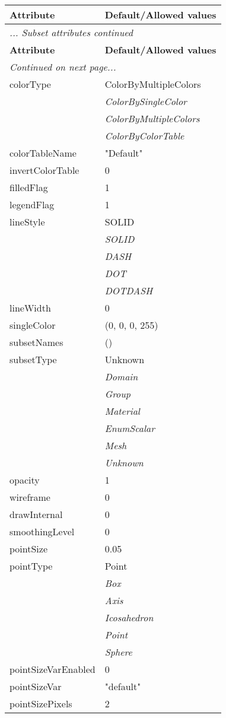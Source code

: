 \documentclass[10pt,a4paper]{report}
\begin{document}
\begin{longtable}{ll}
{\bf Attribute} & {\bf Default/Allowed values} \\
\hline \hline
\endfirsthead
\multicolumn{2}{l}{{\it ... Subset attributes continued}} \\
{\bf Attribute} & {\bf Default/Allowed values} \\
\hline \hline
\endhead
\hline
\multicolumn{2}{l}{{\it Continued on next page...}} \\
\endfoot
\hline
\endlastfoot

colorType  &  ColorByMultipleColors   \\
 & {\it  ColorBySingleColor} \\
 & {\it  ColorByMultipleColors} \\
 & {\it  ColorByColorTable} \\
colorTableName  &  "Default" \\
invertColorTable  &  0 \\
filledFlag  &  1 \\
legendFlag  &  1 \\
lineStyle  &  SOLID   \\
 & {\it  SOLID} \\
 & {\it  DASH} \\
 & {\it  DOT} \\
 & {\it  DOTDASH} \\
lineWidth  &  0 \\
singleColor  &  (0, 0, 0, 255) \\
subsetNames  &  () \\
subsetType  &  Unknown   \\
 & {\it  Domain} \\
 & {\it  Group} \\
 & {\it  Material} \\
 & {\it  EnumScalar} \\
 & {\it  Mesh} \\
 & {\it  Unknown} \\
opacity  &  1 \\
wireframe  &  0 \\
drawInternal  &  0 \\
smoothingLevel  &  0 \\
pointSize  &  0.05 \\
pointType  &  Point   \\
 & {\it  Box} \\
 & {\it  Axis} \\
 & {\it  Icosahedron} \\
 & {\it  Point} \\
 & {\it  Sphere} \\
pointSizeVarEnabled  &  0 \\
pointSizeVar  &  "default" \\
pointSizePixels  &  2 \\
\end{longtable}
\end{document}
